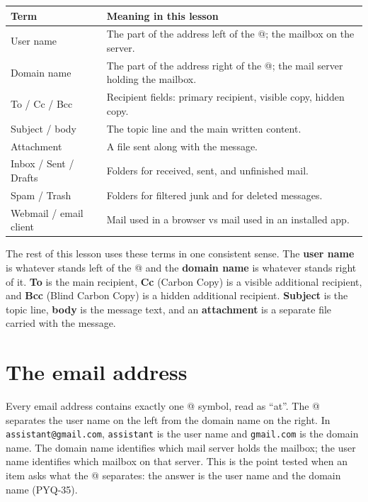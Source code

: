\begin{center}
\begin{tabular}{p{}p{}}
\toprule
\textbf{Term} & \textbf{Meaning in this lesson} \\
\midrule
User name & The part of the address left of the @; the mailbox on the server. \\
Domain name & The part of the address right of the @; the mail server holding the mailbox. \\
To / Cc / Bcc & Recipient fields: primary recipient, visible copy, hidden copy. \\
Subject / body & The topic line and the main written content. \\
Attachment & A file sent along with the message. \\
Inbox / Sent / Drafts & Folders for received, sent, and unfinished mail. \\
Spam / Trash & Folders for filtered junk and for deleted messages. \\
Webmail / email client & Mail used in a browser vs mail used in an installed app. \\
\bottomrule
\end{tabular}
\end{center}

The rest of this lesson uses these terms in one consistent sense. The
\textbf{user name} is whatever stands left of the @ and the \textbf{domain
name} is whatever stands right of it. \textbf{To} is the main recipient,
\textbf{Cc} (Carbon Copy) is a visible additional recipient, and \textbf{Bcc}
(Blind Carbon Copy) is a hidden additional recipient. \textbf{Subject} is the
topic line, \textbf{body} is the message text, and an \textbf{attachment} is a
separate file carried with the message.

\section{The email address}
Every email address contains exactly one @ symbol, read as ``at''. The @
separates the user name on the left from the domain name on the right. In
\texttt{assistant@gmail.com}, \texttt{assistant} is the user name and
\texttt{gmail.com} is the domain name. The domain name identifies which mail
server holds the mailbox; the user name identifies which mailbox on that
server. This is the point tested when an item asks what the @ separates: the
answer is the user name and the domain name (PYQ-35).

